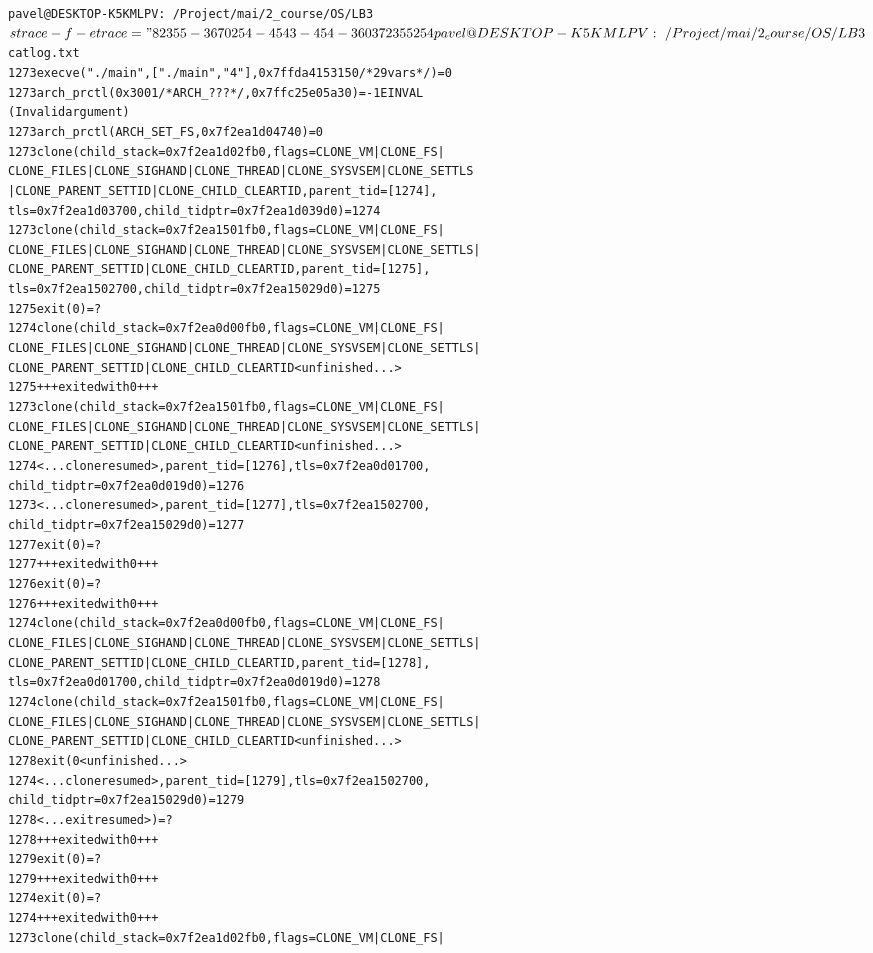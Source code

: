\documentclass[pdf, unicode, 12pt, a4paper,oneside,fleqn]{article}
\begin{document}
\begin{alltt}
pavel@DESKTOP-K5KMLPV:~/Project/mai/2_course/OS/LB3$ strace -f -e 
trace="%process,write" -o log.txt ./main 4
8
23 55 -36 7 0 254 -454 3
-454
-36
0
3
7
23
55
254
pavel@DESKTOP-K5KMLPV:~/Project/mai/2_course/OS/LB3$ cat log.txt
1273  execve("./main", ["./main", "4"], 0x7ffda4153150 /* 29 vars */) = 0
1273  arch_prctl(0x3001 /* ARCH_??? */, 0x7ffc25e05a30) = -1 EINVAL 
(Invalid argument)
1273  arch_prctl(ARCH_SET_FS, 0x7f2ea1d04740) = 0
1273  clone(child_stack=0x7f2ea1d02fb0, flags=CLONE_VM|CLONE_FS|
CLONE_FILES|CLONE_SIGHAND|CLONE_THREAD|CLONE_SYSVSEM|CLONE_SETTLS
|CLONE_PARENT_SETTID|CLONE_CHILD_CLEARTID, parent_tid=[1274],
tls=0x7f2ea1d03700, child_tidptr=0x7f2ea1d039d0) = 1274
1273  clone(child_stack=0x7f2ea1501fb0, flags=CLONE_VM|CLONE_FS|
CLONE_FILES|CLONE_SIGHAND|CLONE_THREAD|CLONE_SYSVSEM|CLONE_SETTLS|
CLONE_PARENT_SETTID|CLONE_CHILD_CLEARTID, parent_tid=[1275], 
tls=0x7f2ea1502700, child_tidptr=0x7f2ea15029d0) = 1275
1275  exit(0)                           = ?
1274  clone(child_stack=0x7f2ea0d00fb0, flags=CLONE_VM|CLONE_FS|
CLONE_FILES|CLONE_SIGHAND|CLONE_THREAD|CLONE_SYSVSEM|CLONE_SETTLS|
CLONE_PARENT_SETTID|CLONE_CHILD_CLEARTID <unfinished ...>
1275  +++ exited with 0 +++
1273  clone(child_stack=0x7f2ea1501fb0, flags=CLONE_VM|CLONE_FS|
CLONE_FILES|CLONE_SIGHAND|CLONE_THREAD|CLONE_SYSVSEM|CLONE_SETTLS|
CLONE_PARENT_SETTID|CLONE_CHILD_CLEARTID <unfinished ...>
1274  <... clone resumed>, parent_tid=[1276], tls=0x7f2ea0d01700, 
child_tidptr=0x7f2ea0d019d0) = 1276
1273  <... clone resumed>, parent_tid=[1277], tls=0x7f2ea1502700, 
child_tidptr=0x7f2ea15029d0) = 1277
1277  exit(0)                           = ?
1277  +++ exited with 0 +++
1276  exit(0)                           = ?
1276  +++ exited with 0 +++
1274  clone(child_stack=0x7f2ea0d00fb0, flags=CLONE_VM|CLONE_FS|
CLONE_FILES|CLONE_SIGHAND|CLONE_THREAD|CLONE_SYSVSEM|CLONE_SETTLS|
CLONE_PARENT_SETTID|CLONE_CHILD_CLEARTID, parent_tid=[1278], 
tls=0x7f2ea0d01700, child_tidptr=0x7f2ea0d019d0) = 1278
1274  clone(child_stack=0x7f2ea1501fb0, flags=CLONE_VM|CLONE_FS|
CLONE_FILES|CLONE_SIGHAND|CLONE_THREAD|CLONE_SYSVSEM|CLONE_SETTLS|
CLONE_PARENT_SETTID|CLONE_CHILD_CLEARTID <unfinished ...>
1278  exit(0 <unfinished ...>
1274  <... clone resumed>, parent_tid=[1279], tls=0x7f2ea1502700, 
child_tidptr=0x7f2ea15029d0) = 1279
1278  <... exit resumed>)               = ?
1278  +++ exited with 0 +++
1279  exit(0)                           = ?
1279  +++ exited with 0 +++
1274  exit(0)                           = ?
1274  +++ exited with 0 +++
1273  clone(child_stack=0x7f2ea1d02fb0, flags=CLONE_VM|CLONE_FS|

\end{alltt}
\end{document}
